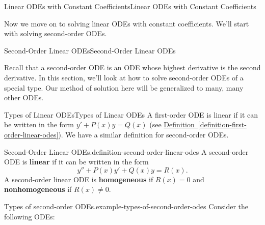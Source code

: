 \documentclass[10pt,]{book}
\newcommand{\terminology}[1]{\textbf{#1}}
\numberwithin{equation}{section}
\begin{document}
\begin{chapterptx}{Linear ODEs with Constant Coefficients}{}{Linear ODEs with Constant Coefficients}{}{}\label{linear-odes-constant-coefficients}
\begin{introduction}{}%
\hypertarget{p-143}{}%
Now we move on to solving linear ODEs with constant coefficients. We'll start with solving second-order ODEs.%
\end{introduction}%
%
%
\typeout{************************************************}
\typeout{************************************************}
%
\begin{sectionptx}{Second-Order Linear ODEs}{}{Second-Order Linear ODEs}{}{}\label{section-second-order-linear-odes}
\begin{introduction}{}%
\hypertarget{p-144}{}%
Recall that a second-order ODE is an ODE whose highest derivative is the second derivative. In this section, we'll look at how to solve second-order ODEs of a special type. Our method of solution here will be generalized to many, many other ODEs.%
\end{introduction}%
%
%
\typeout{************************************************}
\typeout{************************************************}
%
\begin{subsectionptx}{Types of Linear ODEs}{}{Types of Linear ODEs}{}{}\label{subsection-types-of-linear-odes}
\hypertarget{p-145}{}%
A first-order ODE is linear if it can be written in the form \(y'+P(x)y = Q(x)\) (see \hyperref[definition-first-order-linear-odes]{Definition~\ref{definition-first-order-linear-odes}}). We have a similar definition for second-order ODEs.%
\begin{definition}{Second-Order Linear ODEs.}{definition-second-order-linear-odes}%
\hypertarget{p-146}{}%
A second-order ODE is \terminology{linear} if it can be written in the form%
\begin{equation*}
y''+P(x)y'+Q(x)y = R(x).
\end{equation*}
A second-order linear ODE is \terminology{homogeneous} if \(R(x) = 0\) and \terminology{nonhomogeneous} if \(R(x)\neq0\).%
\end{definition}
\begin{example}{Types of second-order ODEs.}{example-types-of-second-order-odes}%
\hypertarget{p-147}{}%
Consider the following ODEs: \leavevmode%
\begin{enumerate}

\end{enumerate}
\end{example}
\end{subsectionptx}
\end{sectionptx}
\end{chapterptx}
\end{document}
